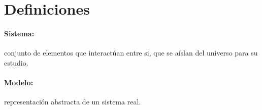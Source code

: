 \documentclass[12pt, a4paper, twoside]{paquetes-apunte/apunte}
\begin{document}
\maketitle

\tableofcontents

\newpage
\section{Definiciones}

\paragraph{Sistema:} conjunto de elementos que interactúan entre si,
que se aíslan del universo para su estudio.

\paragraph{Modelo:} representación abstracta de un sistema real.
\end{document}
